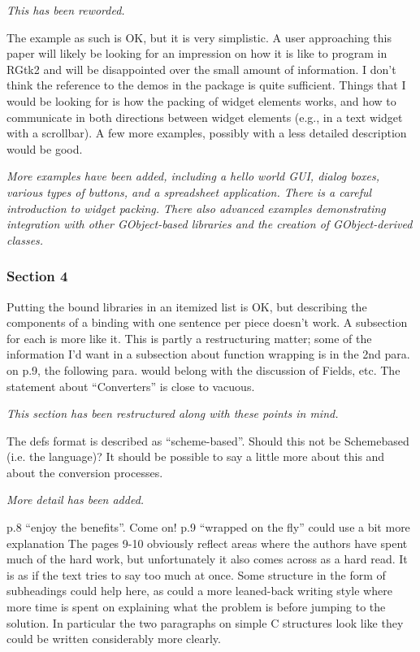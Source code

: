 \documentclass{article}
\begin{document}
\emph{This has been reworded.}

The example as such is OK, but it is very simplistic. A user approaching this
paper will likely be looking for an impression on how it is like to program in
RGtk2 and will be disappointed over the small amount of information. I don't
think the reference to the demos in the package is quite sufficient. Things that
I would be looking for is how the packing of widget elements works, and how to
communicate in both directions between widget elements (e.g., in a text widget
with a scrollbar). A few more examples, possibly with a less detailed description
would be good.

\emph{More examples have been added, including a hello world GUI, dialog boxes,
various types of buttons, and a spreadsheet application. 
There is a careful introduction to widget packing. There also advanced examples
demonstrating integration with other GObject-based libraries and the
creation of GObject-derived classes.}

\subsubsection*{Section 4}

Putting the bound libraries in an itemized list is OK, but describing the components
of a binding with one sentence per piece doesn't work. A subsection
for each is more like it. This is partly a restructuring matter; some of the information
I'd want in a subsection about function wrapping is in the 2nd para.
on p.9, the following para. would belong with the discussion of Fields, etc.
The statement about ``Converters'' is close to vacuous.

\emph{This section has been restructured along with these points in mind.}

The defs format is described as ``scheme-based''. Should this not be Schemebased
(i.e. the language)? It should be possible to say a little more about this
and about the conversion processes.

\emph{More detail has been added.}

p.8 ``enjoy the benefits''. Come on!
p.9 ``wrapped on the fly'' could use a bit more explanation
The pages 9-10 obviously reflect areas where the authors have spent much of the
hard work, but unfortunately it also comes across as a hard read. It is as if the
text tries to say too much at once. Some structure in the form of subheadings
could help here, as could a more leaned-back writing style where more time is
spent on explaining what the problem is before jumping to the solution. In
particular the two paragraphs on simple C structures look like they could be
written considerably more clearly.
\end{document}
